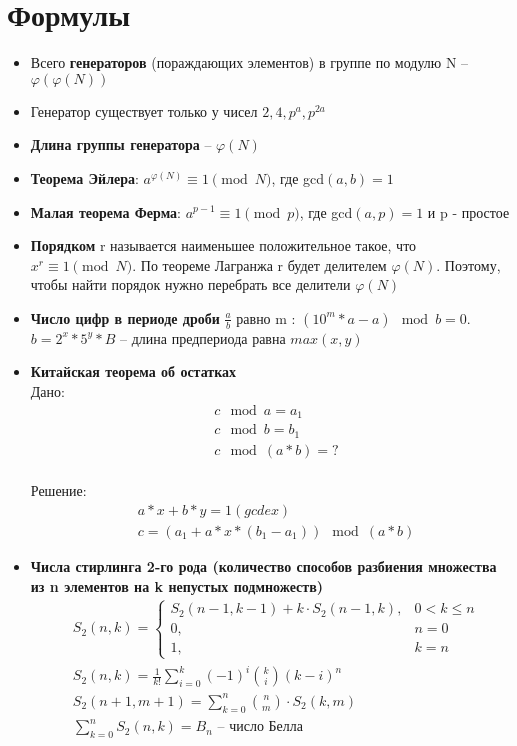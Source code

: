 \documentclass[10pt]{article}
\begin{document}
\section{Формулы}
\begin{itemize}
\item Всего \textbf{генераторов} (пораждающих элементов) в группе по модулю N -- $\varphi(\varphi(N))$
\item Генератор существует только у чисел $2, 4, p^a, p^{2a}$
\item \textbf{Длина группы генератора} -- $\varphi(N)$
\item \textbf{Теорема Эйлера}: $a^{\varphi(N)} \equiv 1 \pmod{N}$, где gcd$(a, b) = 1$
\item \textbf{Малая теорема Ферма}: $a^{p-1} \equiv 1 \pmod{p}$, где gcd$(a, p) = 1$ и p - простое
\item \textbf{Порядком} r называется наименьшее положительное такое, что $x^r \equiv 1 \pmod{N}$.
По теореме Лагранжа r будет делителем $\varphi(N)$. Поэтому, чтобы найти порядок нужно перебрать все делители $\varphi(N)$
\item \textbf{Число цифр в периоде дроби} $\frac{a}{b}$ равно m : $(10^{m}*a - a) \mod{b} = 0$. $b = 2^x*5^y*B$ -- длина предпериода равна $max(x, y)$
\item \textbf{Китайская теорема об остатках}
\\ Дано: 
\begin{equation*}
  \begin{split}
    &c\mod a = a_1 \\
    &c\mod b = b_1 \\
    &c\mod (a * b) = ?
  \end{split}
  \end{equation*}
\\ Решение:
\begin{equation*}
  \begin{split}
    &a*x + b*y = 1 (gcdex)\\
    &c = (a_1 + a * x * (b_1 - a_1)) \mod (a * b)
  \end{split}
  \end{equation*}
\item \textbf{Числа стирлинга 2-го рода (количество способов разбиения множества из n элементов на k непустых подмножеств)}
\begin{equation}
  \begin{split}
    &S_2(n, k) = 
    \left\{
    \begin{array}{cc}
    S_2(n-1, k-1) + k \cdot S_2(n-1, k), & 0 < k \le n\\
    0, & n = 0\\
    1, & k = n
    \end{array}
    \right.\\
    &S_2(n, k) = \frac{1}{k!}\sum\limits_{i=0}^k(-1)^{i}\binom{k}{i}(k - i)^n\\
    &S_2(n + 1, m + 1) = \sum\limits_{k=0}^n\binom{n}{m} \cdot S_2(k, m)\\
    &\sum\limits_{k=0}^nS_2(n, k) = B_n \text{ -- число Белла}
  \end{split}
\end{equation}
\begin{longtable}[c]{lllllllllll}


\end{longtable}
\end{itemize}
\end{document}
